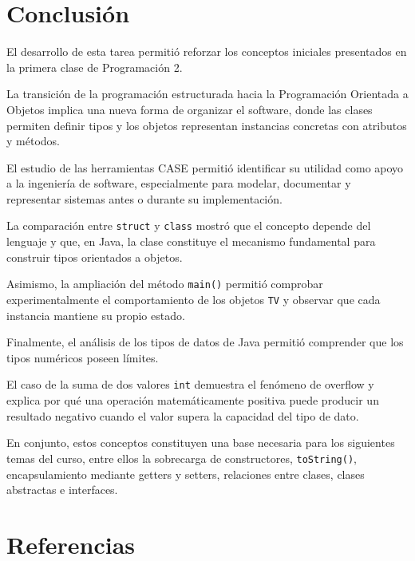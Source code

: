 \documentclass[12pt,a4paper]{article}
\begin{document}
\newpage
\section{Conclusión}

El desarrollo de esta tarea permitió reforzar los conceptos iniciales
presentados en la primera clase de Programación 2.

La transición de la programación estructurada hacia la Programación
Orientada a Objetos implica una nueva forma de organizar el software,
donde las clases permiten definir tipos y los objetos representan
instancias concretas con atributos y métodos.

El estudio de las herramientas CASE permitió identificar su utilidad
como apoyo a la ingeniería de software, especialmente para modelar,
documentar y representar sistemas antes o durante su implementación.

La comparación entre \texttt{struct} y \texttt{class} mostró que el
concepto depende del lenguaje y que, en Java, la clase constituye el
mecanismo fundamental para construir tipos orientados a objetos.

Asimismo, la ampliación del método \texttt{main()} permitió comprobar
experimentalmente el comportamiento de los objetos \texttt{TV} y
observar que cada instancia mantiene su propio estado.

Finalmente, el análisis de los tipos de datos de Java permitió
comprender que los tipos numéricos poseen límites.

El caso de la suma de dos valores \texttt{int} demuestra el fenómeno
de overflow y explica por qué una operación matemáticamente positiva
puede producir un resultado negativo cuando el valor supera la
capacidad del tipo de dato.

En conjunto, estos conceptos constituyen una base necesaria para los
siguientes temas del curso, entre ellos la sobrecarga de constructores,
\texttt{toString()}, encapsulamiento mediante getters y setters,
relaciones entre clases, clases abstractas e interfaces.


\section{Referencias}
\end{document}
